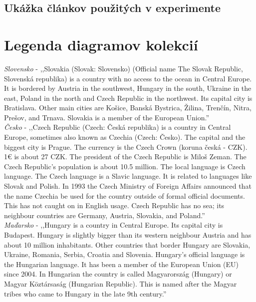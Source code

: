 \newpage
{}
{
	\section{Ukážka článkov použitých v experimente}
}
{
	\chapter{Legenda diagramov kolekcií}
}
\textit{Slovensko} - ,,Slovakia (Slovak: Slovensko) (Official name The Slovak Republic, Slovenská republika) is a country with no access to the ocean in Central Europe. It is bordered by Austria in the southwest, Hungary in the south, Ukraine in the east, Poland in the north and Czech Republic in the northwest. Its capital city is Bratislava. Other main cities are Košice, Banská Bystrica, Žilina, Trenčín, Nitra, Prešov, and Trnava. Slovakia is a member of the European Union.'' \\

\noindent
\textit{Česko} - ,,Czech Republic (Czech: Česká republika) is a country in Central Europe, sometimes also known as Czechia (Czech: Česko). The capital and the biggest city is Prague. The currency is the Czech Crown (koruna česká - CZK). 1€ is about 27 CZK. The president of the Czech Republic is Miloš Zeman. The Czech Republic's population is about 10.5 million. The local language is Czech language. The Czech language is a Slavic language. It is related to languages like Slovak and Polish. In 1993 the Czech Ministry of Foreign Affairs announced that the name Czechia be used for the country outside of formal official documents. This has not caught on in English usage. Czech Republic has no sea; its neighbour countries are Germany, Austria, Slovakia, and Poland.'' \\

\noindent
\textit{Maďarsko} - ,,Hungary is a country in Central Europe. Its capital city is Budapest. Hungary is slightly bigger than its western neighbour Austria and has about 10 million inhabitants. Other countries that border Hungary are Slovakia, Ukraine, Romania, Serbia, Croatia and Slovenia. Hungary's official language is the Hungarian language. It has been a member of the European Union (EU) since 2004. In Hungarian the country is called Magyarország (Hungary) or Magyar Köztársaság (Hungarian Republic). This is named after the Magyar tribes who came to Hungary in the late 9th century.'' \\

